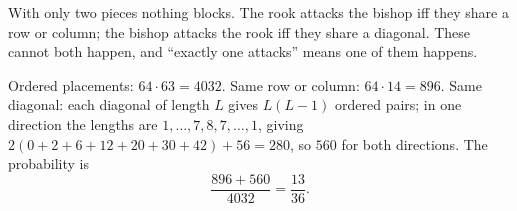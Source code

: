 With only two pieces nothing blocks. The rook attacks the bishop iff they share a row or column; the bishop attacks the rook iff they share a diagonal. These cannot both happen, and ``exactly one attacks'' means one of them happens.

Ordered placements: $64\cdot63=4032$. Same row or column: $64\cdot14=896$. Same diagonal: each diagonal of length $L$ gives $L(L-1)$ ordered pairs; in one direction the lengths are $1,\dots,7,8,7,\dots,1$, giving $2(0+2+6+12+20+30+42)+56=280$, so $560$ for both directions. The probability is
\[\dfrac{896+560}{4032}=\boxed{\dfrac{13}{36}}.\]
